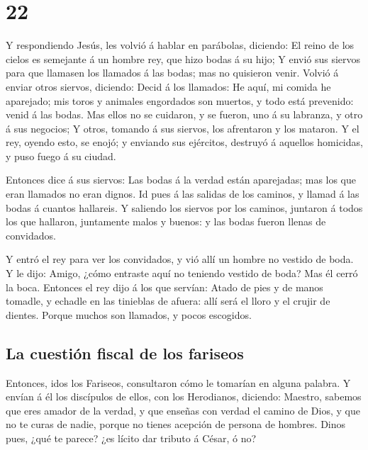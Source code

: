\hypertarget{section-21}{%
\section{22}\label{section-21}}

 Y respondiendo Jesús, les volvió á hablar en parábolas,
diciendo:  El reino de los cielos es semejante á un hombre
rey, que hizo bodas á su hijo;  Y envió sus siervos para que
llamasen los llamados á las bodas; mas no quisieron venir. 
Volvió á enviar otros siervos, diciendo: Decid á los llamados: He aquí,
mi comida he aparejado; mis toros y animales engordados son muertos, y
todo está prevenido: venid á las bodas.  Mas ellos no se
cuidaron, y se fueron, uno á su labranza, y otro á sus negocios;
 Y otros, tomando á sus siervos, los afrentaron y los
mataron.  Y el rey, oyendo esto, se enojó; y enviando sus
ejércitos, destruyó á aquellos homicidas, y puso fuego á su ciudad.

 Entonces dice á sus siervos: Las bodas á la verdad están
aparejadas; mas los que eran llamados no eran dignos.  Id
pues á las salidas de los caminos, y llamad á las bodas á cuantos
hallareis.  Y saliendo los siervos por los caminos,
juntaron á todos los que hallaron, juntamente malos y buenos: y las
bodas fueron llenas de convidados.

 Y entró el rey para ver los convidados, y vió allí un
hombre no vestido de boda.  Y le dijo: Amigo, ¿cómo
entraste aquí no teniendo vestido de boda? Mas él cerró la boca.
 Entonces el rey dijo á los que servían: Atado de pies y de
manos tomadle, y echadle en las tinieblas de afuera: allí será el lloro
y el crujir de dientes.  Porque muchos son llamados, y
pocos escogidos.

\hypertarget{la-cuestiuxf3n-fiscal-de-los-fariseos}{%
\subsection{La cuestión fiscal de los
fariseos}\label{la-cuestiuxf3n-fiscal-de-los-fariseos}}

 Entonces, idos los Fariseos, consultaron cómo le tomarían
en alguna palabra.  Y envían á él los discípulos de ellos,
con los Herodianos, diciendo: Maestro, sabemos que eres amador de la
verdad, y que enseñas con verdad el camino de Dios, y que no te curas de
nadie, porque no tienes acepción de persona de hombres. 
Dinos pues, ¿qué te parece? ¿es lícito dar tributo á César, ó no?

